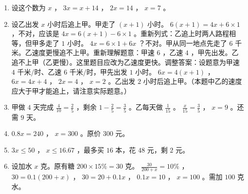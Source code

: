 \begin{answer}
\begin{enumerate}
  \item 设这个数为 $x$ ， $3x = x + 14$ ， $2x = 14$ ， $x = 7$ 。
  \item 设乙出发 $x$ 小时后追上甲。甲走了 $(x+1)$ 小时。 $6(x+1) = 4x + 6 \times 1$ ，不对，应该是 $4x = 6(x+1) - 6 \times 1$ 。重新列式：乙追上时两人路程相等，但甲多走了 $1$ 小时。 $4x = 6 \times 1 + 6x$ ？不对。甲从同一地点先走了 $6$ 千米。乙速度更慢追不上甲。重新理解题意：甲速 $6$ ，乙速 $4$ ，甲先出发。乙追不上甲（乙更慢）。这里题目应改为乙速度更快。调整答案：设题意为甲速 $4$ 千米/时、乙速 $6$ 千米/时，甲先出发 $1$ 小时。 $6x = 4(x + 1)$ ， $6x = 4x + 4$ ， $2x = 4$ ， $x = 2$ 。乙出发 $2$ 小时后追上甲。（本题中乙的速度应大于甲才能追上，请注意实际题意。）
  \item 甲做 $4$ 天完成 $\frac{4}{10} = \frac{2}{5}$ ，剩余 $1 - \frac{2}{5} = \frac{3}{5}$ 。乙每天做 $\frac{1}{15}$ 。 $\frac{x}{15} = \frac{3}{5}$ ， $x = 9$ 。还需 $9$ 天。
  \item $0.8x = 240$ ， $x = 300$ 。原价 $300$ 元。
  \item $3x \leq 50$ ， $x \leq 16.67$ ，最多买 $16$ 本，花 $48$ 元，剩 $2$ 元。
  \item 设加水 $x$ 克。原有糖 $200 \times 15\% = 30$ 克。 $\frac{30}{200 + x} = 10\%$ ， $30 = 0.1(200 + x)$ ， $30 = 20 + 0.1x$ ， $0.1x = 10$ ， $x = 100$ 。需加 $100$ 克水。
\end{enumerate}


\end{answer}
